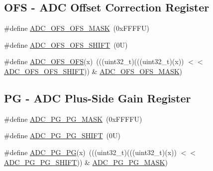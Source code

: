 \subsection*{O\+FS -\/ A\+DC Offset Correction Register}
\begin{DoxyCompactItemize}
\item 
\#define \mbox{\hyperlink{group___a_d_c___register___masks_ga1532ae43eb63d6c071f531cca89fdb68}{A\+D\+C\+\_\+\+O\+F\+S\+\_\+\+O\+F\+S\+\_\+\+M\+A\+SK}}~(0x\+F\+F\+F\+F\+U)
\item 
\#define \mbox{\hyperlink{group___a_d_c___register___masks_ga86de5d25a5433db6e96700e2d000ad07}{A\+D\+C\+\_\+\+O\+F\+S\+\_\+\+O\+F\+S\+\_\+\+S\+H\+I\+FT}}~(0\+U)
\item 
\#define \mbox{\hyperlink{group___a_d_c___register___masks_gad48888faa6b880f4011253b53413f37b}{A\+D\+C\+\_\+\+O\+F\+S\+\_\+\+O\+FS}}(x)~(((uint32\+\_\+t)(((uint32\+\_\+t)(x)) $<$$<$ \mbox{\hyperlink{group___a_d_c___register___masks_ga86de5d25a5433db6e96700e2d000ad07}{A\+D\+C\+\_\+\+O\+F\+S\+\_\+\+O\+F\+S\+\_\+\+S\+H\+I\+FT}})) \& \mbox{\hyperlink{group___a_d_c___register___masks_ga1532ae43eb63d6c071f531cca89fdb68}{A\+D\+C\+\_\+\+O\+F\+S\+\_\+\+O\+F\+S\+\_\+\+M\+A\+SK}})
\end{DoxyCompactItemize}
\subsection*{PG -\/ A\+DC Plus-\/\+Side Gain Register}
\begin{DoxyCompactItemize}
\item 
\#define \mbox{\hyperlink{group___a_d_c___register___masks_ga0619279d8dcf43af1fda9f27090ae51b}{A\+D\+C\+\_\+\+P\+G\+\_\+\+P\+G\+\_\+\+M\+A\+SK}}~(0x\+F\+F\+F\+F\+U)
\item 
\#define \mbox{\hyperlink{group___a_d_c___register___masks_ga014623fb35c473d12ff7fc64c3e8cfe3}{A\+D\+C\+\_\+\+P\+G\+\_\+\+P\+G\+\_\+\+S\+H\+I\+FT}}~(0\+U)
\item 
\#define \mbox{\hyperlink{group___a_d_c___register___masks_ga4b6bf1c895aa431e08bed733de13e71e}{A\+D\+C\+\_\+\+P\+G\+\_\+\+PG}}(x)~(((uint32\+\_\+t)(((uint32\+\_\+t)(x)) $<$$<$ \mbox{\hyperlink{group___a_d_c___register___masks_ga014623fb35c473d12ff7fc64c3e8cfe3}{A\+D\+C\+\_\+\+P\+G\+\_\+\+P\+G\+\_\+\+S\+H\+I\+FT}})) \& \mbox{\hyperlink{group___a_d_c___register___masks_ga0619279d8dcf43af1fda9f27090ae51b}{A\+D\+C\+\_\+\+P\+G\+\_\+\+P\+G\+\_\+\+M\+A\+SK}})
\end{DoxyCompactItemize}
